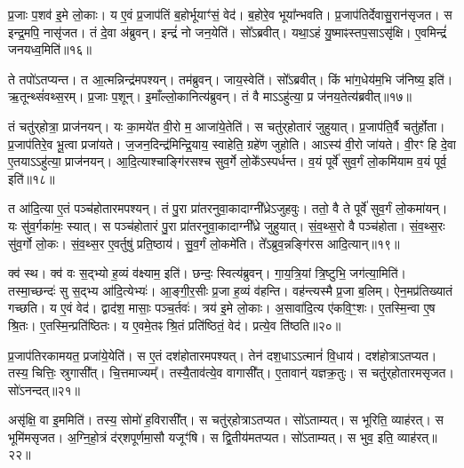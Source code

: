 प्र॒जाः प॒शव॑ इ॒मे लो॒काः।
य ए॒वं प्र॒जा\-प॑तिं ब॒होर्भूयाꣳ॑सं॒ वेद॑।
ब॒होरे॒व भूया᳚न्भवति।
प्र॒जा\-प॑तिर्देवासु॒रान॑\-सृजत।
स इन्द्र॒मपि॒ नासृ॑जत।
तं दे॒वा अ॑ब्रुवन्।
इन्द्रं॑ नो जन॒येति॑।
सो᳚ऽब्रवीत्।
यथा॒ऽहं यु॒ष्माꣴस्तप॒सा\-ऽसृ॑क्षि।
ए॒वमिन्द्रं॑ जनयध्व॒मिति॑॥१६॥\ip

ते तपो॑\-ऽतप्यन्त।
त आ॒त्मन्निन्द्र॑मपश्यन्।
तम॑ब्रुवन्।
जाय॒स्वेति॑।
सो᳚ऽब्रवीत्।
किं भा॑ग॒धेय॑म॒भि ज॑निष्य॒ इति॑।
ऋ॒तून्थ्सं॑वथ्स॒रम्।
प्र॒जाः प॒शून्।
इ॒माँल्लो॒कानित्य॑ब्रुवन्।
तं वै माऽऽहु॑त्या॒ प्र ज॑नय॒तेत्य॑ब्रवीत्॥१७॥\ip

तं चतु॑र्‌\mbox{}होत्रा॒ प्राज॑नयन्।
यः का॒मये॑त वी॒रो म॒ आजा॑ये॒तेति॑।
स चतु॑र्‌\mbox{}होतारं जुहुयात्।
प्र॒जा\-प॑ति॒र्वै चतु॑र्\mbox{}होता।
प्र॒जा\-प॑तिरे॒व भू॒त्वा प्रजा॑यते।
ज॒जन॒दिन्द्र॑मिन्द्रि॒याय॒ स्वाहेति॒ ग्रहे॑ण जुहोति।
आऽस्य॑ वी॒रो जा॑यते।
वी॒रꣳ हि दे॒वा ए॒तया\-ऽऽहु॑त्या॒ प्राज॑नयन्।
आ॒दि॒त्याश्चाङ्गि॑रसश्च सुव॒र्गे लो॒के᳚\-ऽस्पर्धन्त।
व॒यं पूर्वे॑ सुव॒र्गं लो॒कमि॑याम व॒यं पूर्व॒ इति॑॥१८॥\ip

त आ॑दि॒त्या ए॒तं पञ्च॑होतारमपश्यन्।
तं पु॒रा प्रा॑तरनु\-वा॒कादाग्नी᳚ध्रे\-ऽजुहवुः।
ततो॒ वै ते पूर्वे॑ सुव॒र्गं लो॒कमा॑यन्।
यः सु॑व॒र्गका॑मः॒ स्यात्।
स पञ्च॑होतारं पु॒रा प्रा॑तरनु\-वा॒का\-दाग्नी᳚ध्रे जुहुयात्।
सं॒व॒थ्स॒रो वै पञ्च॑होता।
सं॒व॒थ्स॒रः सु॑व॒र्गो लो॒कः।
सं॒व॒थ्स॒र ए॒वर्तुषु॑ प्रति॒ष्ठाय॑।
सु॒व॒र्गं लो॒कमे॑ति।
ते᳚ऽब्रुव॒न्नङ्गि॑रस आदि॒त्यान्॥१९॥\ip

क्व॑ स्थ।
क्व॑ वः स॒द्भ्यो ह॒व्यं व॑क्ष्याम॒ इति॑।
छन्दः॒ स्वित्य॑ब्रुवन्।
गा॒य॒त्रि॒यां त्रि॒ष्टुभि॒ जग॑त्या॒मिति॑।
तस्मा॒च्छन्दः॑ सु स॒द्भ्य आ॑दि॒त्येभ्यः॑।
आ॒ङ्गी॒र॒सीः प्र॒जा ह॒व्यं व॑हन्ति।
वह॑न्त्यस्मै प्र॒जा ब॒लिम्।
ऐन॒मप्र॑तिख्यातं गच्छति।
य ए॒वं वेद॑।
द्वाद॑श॒ मासाः॒ पञ्च॒र्तवः॑।
त्रय॑ इ॒मे लो॒काः।
अ॒सावा॑दि॒त्य ए॑कवि॒ꣳ॒शः।
ए॒तस्मि॒न्वा ए॒ष श्रि॒तः।
ए॒तस्मि॒न्प्रति॑\-ष्ठितः।
य ए॒वमे॒तꣴ श्रि॒तं प्रति॑\-ष्ठितं॒ वेद॑।
प्रत्ये॒व ति॑ष्ठति॥२०॥\ip\anuvakamend[स्या॒दिति॑ संवथ्स॒रो ज॑नयध्व॒मितीत्य॑ब्रवी॒त्पूर्व॒ इत्या॑दि॒त्यानृ॒तवः॒ षट्च॑]

प्र॒जा\-प॑तिरकामयत॒ प्रजा॑ये॒येति॑।
स ए॒तं दश॑होतारमपश्यत्।
तेन॑ दश॒धा\-ऽऽत्मानं॑ वि॒धाय॑।
दश॑होत्रा\-ऽतप्यत।
तस्य॒ चित्तिः॒ स्रुगासी᳚त्।
चि॒त्तमाज्यम्᳚।
तस्यै॒ताव॑त्ये॒व वागासी᳚त्।
ए॒तावान्॑ यज्ञक्र॒तुः।
स चतु॑र्‌\mbox{}होतारम\-सृजत।
सो॑ऽनन्दत्॥२१॥\ip

असृ॑क्षि॒ वा इ॒ममिति॑।
तस्य॒ सोमो॑ ह॒विरासी᳚त्।
स चतु॑र्‌\mbox{}होत्रा\-ऽतप्यत।
सो॑ऽताम्यत्।
स भूरिति॒ व्याह॑रत्।
स भूमि॑म\-सृजत।
अ॒ग्नि॒हो॒त्रं द॑र्‌\mbox{}शपूर्णमा॒सौ यजूꣳ॑षि।
स द्वि॒तीय॑मतप्यत।
सो॑ऽताम्यत्।
स भुव॒ इति॒ व्याह॑रत्॥२२॥\ip


